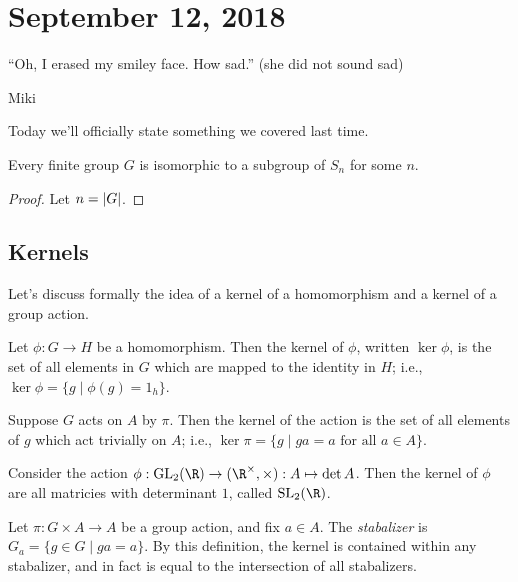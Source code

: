 \section{September 12, 2018}

\epigraph{``Oh, I erased my smiley face. How sad.'' (she did not sound sad)}{Miki}

Today we'll officially state something we covered last time.

\begin{theorem}
Every finite group $G$ is isomorphic to a subgroup of $S_n$ for some $n$.
\end{theorem}
\begin{proof}
Let $n = \abs{G}$.
\end{proof}

\subsection{Kernels}

Let's discuss formally the idea of a kernel of a homomorphism and a kernel of a group action.

\begin{definition}[Kernel]
Let $\phi : G \to H$ be a homomorphism. Then the kernel of $\phi$, written $\ker \phi$, is the set of all elements in $G$ which are mapped to the identity in $H$; i.e., $\ker \phi = \{g \mid \phi(g) = 1_h \}$.
\end{definition}

\begin{definition}
Suppose $G$ acts on $A$ by $\pi$. Then the kernel of the action is the set of all elements of $g$ which act trivially on $A$; i.e., $\ker \pi = \{g \mid ga = a \text{ for all $a \in A$}\}$.
\end{definition}

\begin{example}
Consider the action $\phi : \mathrm{GL}_2(\R) \to (\R^\times, \times) : A \mapsto \det A$. Then the kernel of $\phi$ are all matricies with determinant $1$, called $\mathrm{SL}_2(\R)$.
\end{example}

\begin{definition}[Stabalizer]
Let $\pi : G \times A \to A$ be a group action, and fix $a \in A$. The \emph{stabalizer} is $G_a = \{g \in G \mid ga = a\}$. By this definition, the kernel is contained within any stabalizer, and in fact is equal to the intersection of all stabalizers.
\end{definition}

